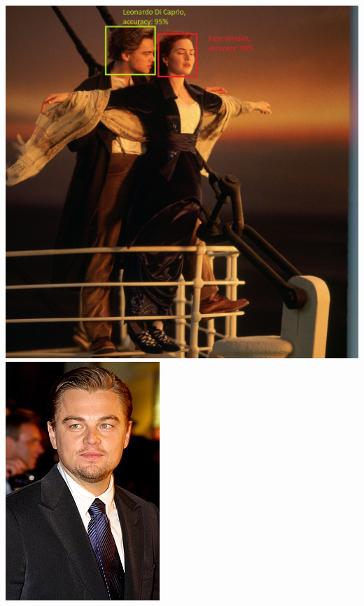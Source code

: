 \documentclass{article}
\begin{document}
\begin{center}
\begin{multicols}{2}
\vspace*{-0.4in}
\includegraphics[scale=0.33]{intro1.jpeg}  
\hspace*{.4in}
{\includegraphics[scale=0.32]{intro3.jpeg}} 
\\
\hspace*{.4in} 

\end{multicols}
\end{center}
\end{document}
